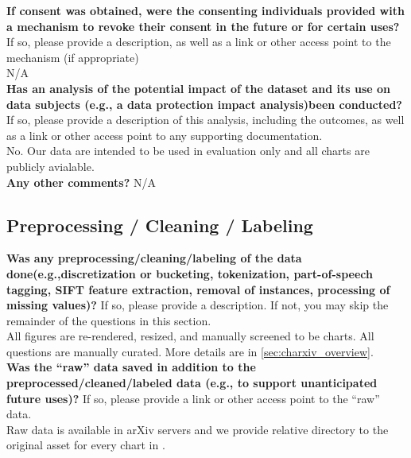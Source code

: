     \textcolor{\sectioncolor}{\textbf{If consent was obtained, were the consenting individuals provided with a
    mechanism to revoke their consent in the future or for certain uses?
    }
     If so, please provide a description, as well as a link or other access
     point to the mechanism (if appropriate)
    } \\
    N/A \\
    
    \textcolor{\sectioncolor}{\textbf{Has an analysis of the potential impact of the dataset and its use on data
    subjects (e.g., a data protection impact analysis)been conducted?
    }
    If so, please provide a description of this analysis, including the
    outcomes, as well as a link or other access point to any supporting
    documentation.
    } \\
    No. Our data are intended to be used in evaluation only and all charts are publicly avialable.  \\
    
    \textcolor{\sectioncolor}{\textbf{Any other comments?
    }} N/A \\

\subsection{Preprocessing / Cleaning / Labeling}

    \textcolor{\sectioncolor}{\textbf{Was any preprocessing/cleaning/labeling of the data
    done(e.g.,discretization or bucketing, tokenization, part-of-speech
    tagging, SIFT feature extraction, removal of instances, processing of
    missing values)?
    }
    If so, please provide a description. If not, you may skip the remainder of
    the questions in this section.
    } \\
    All figures are re-rendered, resized, and manually screened to be charts. All questions are manually curated. More details are in \cref{sec:charxiv_overview}. \\

    \textcolor{\sectioncolor}{\textbf{Was the “raw” data saved in addition to the preprocessed/cleaned/labeled
    data (e.g., to support unanticipated future uses)?
    }
    If so, please provide a link or other access point to the “raw” data.
    } \\
    Raw data is available in arXiv servers and we provide relative directory to the original asset for every chart in \ours{}. \\

